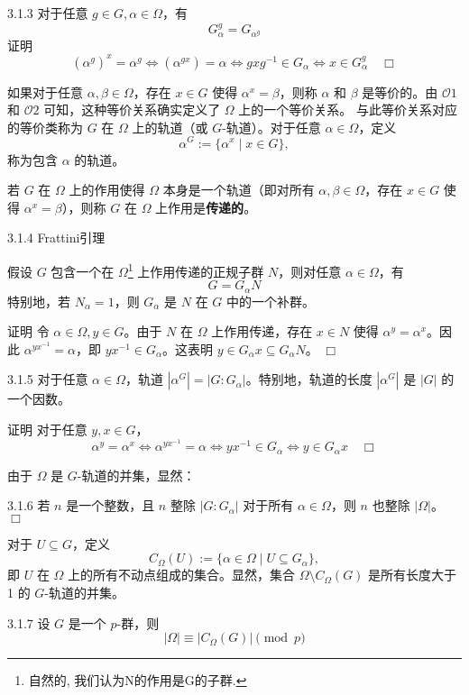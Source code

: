 \documentclass[UTF8]{ctexart}
\begin{document}
3.1.3
对于任意 $g \in G, \alpha \in \Omega$，有
$$
    G_\alpha^g = G_{\alpha^g}
$$
证明
$$
    (\alpha^g)^x = \alpha^g \iff (\alpha^{gx}) = \alpha \iff gxg^{-1} \in G_\alpha \iff x \in G_\alpha^g \quad \Box
$$





如果对于任意 $\alpha, \beta \in \Omega$，存在 $x \in G$ 使得 $\alpha^x = \beta$，则称 $\alpha$ 和 $\beta$ 是等价的。由 $\mathcal{O}1$ 和 $\mathcal{O}2$ 可知，这种等价关系确实定义了 $\Omega$ 上的一个等价关系。
与此等价关系对应的等价类称为 $G$ 在 $\Omega$ 上的轨道（或 $G$-轨道）。对于任意 $\alpha \in \Omega$，定义
$$
    \alpha^G := \{\alpha^x \mid x \in G\},
$$
称为包含 $\alpha$ 的轨道。

若 $G$ 在 $\Omega$ 上的作用使得 $\Omega$ 本身是一个轨道（即对所有 $\alpha, \beta \in \Omega$，存在 $x \in G$ 使得 $\alpha^x = \beta$），则称 $G$ 在 $\Omega$ 上作用是\textbf{传递的}。



3.1.4 Frattini引理


假设 $G$ 包含一个在 $\Omega$\footnote[4]{自然的, 我们认为N的作用是G的子群.} 上作用传递的正规子群 $N$，则对任意 $\alpha \in \Omega$，有
$$
    G = G_\alpha N
$$
特别地，若 $N_\alpha = 1$，则 $G_\alpha$ 是 $N$ 在 $G$ 中的一个补群。


证明
令 $\alpha \in \Omega, y \in G$。由于 $N$ 在 $\Omega$ 上作用传递，存在 $x \in N$ 使得 $\alpha^y = \alpha^x$。因此 $\alpha^{yx^{-1}} = \alpha$，即 $yx^{-1} \in G_\alpha$。这表明 $y \in G_\alpha x \subseteq G_\alpha N$。 $\Box$



3.1.5
对于任意 $\alpha \in \Omega$，轨道 $|\alpha^G| = |G : G_\alpha|$。特别地，轨道的长度 $|\alpha^G|$ 是 $|G|$ 的一个因数。


证明
对于任意 $y, x \in G$，
$$
    \alpha^y = \alpha^x \iff \alpha^{yx^{-1}} = \alpha \iff yx^{-1} \in G_\alpha \iff y \in G_\alpha x \quad \Box
$$

由于 $\Omega$ 是 $G$-轨道的并集，显然：


3.1.6
若 $n$ 是一个整数，且 $n$ 整除 $|G : G_\alpha|$ 对于所有 $\alpha \in \Omega$，则 $n$ 也整除 $|\Omega|$。 $\Box$



对于 $U \subseteq G$，定义
$$
    C_\Omega(U) := \{\alpha \in \Omega \mid U \subseteq G_\alpha\},
$$
即 $U$ 在 $\Omega$ 上的所有不动点组成的集合。显然，集合 $\Omega \setminus C_\Omega(G)$ 是所有长度大于 1 的 $G$-轨道的并集。


3.1.7
设 $G$ 是一个 $p$-群，则
$$
    |\Omega| \equiv |C_\Omega(G)| \pmod{p}
$$
\end{document}
